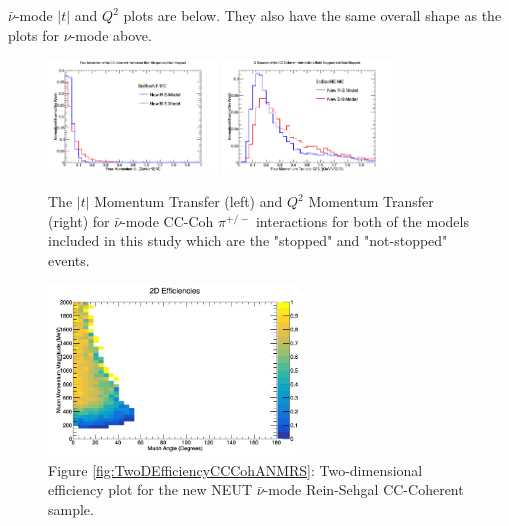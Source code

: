 \documentclass[11pt]{article}
\begin{document}
$\bar{\nu}$-mode $|t|$ and $Q^2$ plots are below. They also have the same overall shape as the plots for $\nu$-mode above.

\begin{figure}[H]
\centering
\includegraphics[width=0.4\textwidth]{CCCohPlots/ANMCCCohGoodT.png}
\includegraphics[width=0.4\textwidth]{CCCohPlots/ANMCCCohGoodQ2.png}
\caption{The $|t|$ Momentum Transfer (left) and $Q^2$ Momentum Transfer (right) for $\bar{\nu}$-mode CC-Coh $\pi^{+/-}$ interactions for both of the models included in this study which are the "stopped" and "not-stopped" events.}
\end{figure}\label{fig:AntiNuModeCCCohGoodTAndQ2}



\begin{figure}[H]
\centering
\includegraphics[width=0.6\textwidth]{CCCohPlots/2DEffANMRS.png}
\caption*{Figure \ref*{fig:TwoDEfficiencyCCCohANMRS}: Two-dimensional efficiency plot for the new NEUT $\bar{\nu}$-mode Rein-Sehgal CC-Coherent sample.}
\end{figure}\label{fig:TwoDEfficiencyCCCohANMRS}
\end{document}
